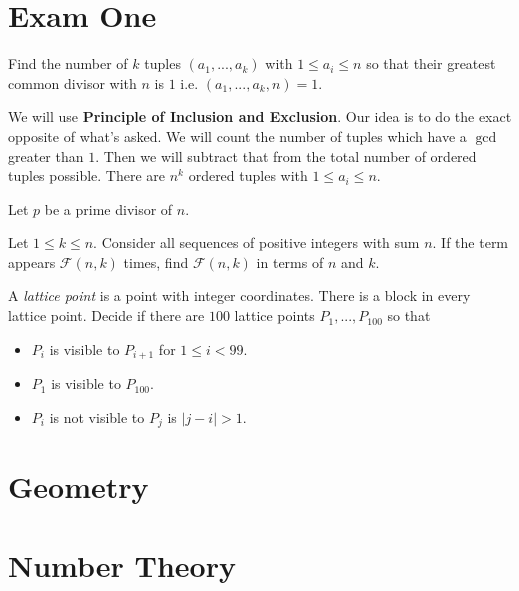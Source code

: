 \documentclass{subfile}
\begin{document}
	\section{Exam One}
	
	\begin{problem}
		Find the number of $k$ tuples $(a_1,...,a_k)$ with $1\leq a_i\leq n$ so that their greatest common divisor with $n$ is $1$ i.e. $(a_1,...,a_k,n)=1$.
	\end{problem}
	
	\begin{solution}
		We will use \textbf{Principle of Inclusion and Exclusion}. Our idea is to do the exact opposite of what's asked. We will count the number of tuples which have a $\gcd$ greater than $1$. Then we will subtract that from the total number of ordered tuples possible. There are $n^k$ ordered tuples with $1\leq a_i\leq n$. 
		
		Let $p$ be a prime divisor of $n$.
	\end{solution}
	
	\begin{problem}
		Let $1\leq k\leq n$. Consider all sequences of positive integers with sum $n$. If the term appears $\mathcal{F}(n,k)$ times, find $\mathcal{F}(n,k)$ in terms of $n$ and $k$.
	\end{problem}
	
	\begin{problem}
		A \textit{lattice point }is a point with integer coordinates. There is a block in every lattice point. Decide if there are $100$ lattice points $P_1,...,P_{100}$ so that 
		\begin{itemize}
			\item $P_i$ is visible to $P_{i+1}$ for $1\leq i<99$.
			\item $P_1$ is visible to $P_{100}$.
			\item $P_i$ is not visible to $P_j$ is $|j-i|>1$.
		\end{itemize}
	\end{problem}
	
	\newpage
	
	\section{Geometry}
	
	\newpage
	
	\section{Number Theory}
	
\end{document}
